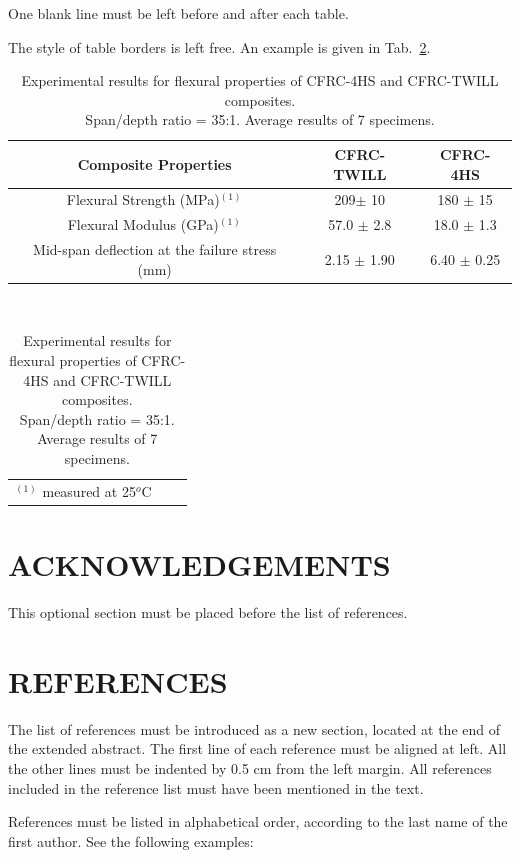 One blank line must be left before and after each table.

The style of table borders is left free. An example is given in Tab.~\ref{tab1}.

\begin{table}[!h]
\centering
\caption{Experimental results for flexural properties of CFRC-4HS and CFRC-TWILL composites. \protect\\Span/depth ratio = 35:1. Average results of 7 specimens.}
\begin{tabular}{|c|c|c|}
\hline
Composite Properties & CFRC-TWILL & CFRC-4HS\\
\hline
Flexural Strength (MPa)$^{(1)}$ & 209$\pm$ 10 & 180 $\pm$  15\\
\hline
Flexural Modulus (GPa)$^{(1)}$ & 57.0 $\pm$ 2.8 & 18.0 $\pm$  1.3\\
\hline
Mid-span deflection at the failure stress (mm) & 2.15 $\pm$  1.90 & 6.40 $\pm$  0.25\\
\hline
\end{tabular}
\\
\begin{tabular}{p{11cm}ll}
$^{(1)}$ measured at 25$^{o}$C & &
\end{tabular}
\label{tab1}
\end{table}

\section{ACKNOWLEDGEMENTS}
This optional section must be placed before the list of references.

\section{REFERENCES}

The list of references must be introduced as a new section, located at the end of the extended abstract. The first line of each reference must be aligned at left.  All the other lines must be indented by 0.5 cm from the left margin. All references included in the reference list must have been mentioned in the text.

References must be listed in alphabetical order, according to the last name of the first author. See the following examples:
